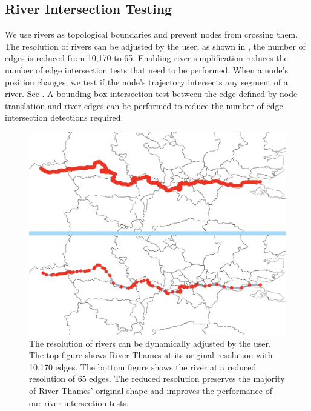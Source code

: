 
\subsection{River Intersection Testing}

We use rivers as topological boundaries and prevent nodes from crossing them. The resolution of rivers can be adjusted by the user, as shown in , the number of edges is reduced from 10,170 to 65. Enabling river simplification reduces the number of edge intersection tests that need to be performed. When a node's position changes, we test if the node's trajectory intersects any segment of a river. See . A bounding box intersection test between the edge defined by node translation and river edges can be performed to reduce the number of edge intersection detections required.


{
\begin{figure}[tb!]
    \centering
    \includegraphics[width=\columnwidth]{figure/river_resolution.png}
    \caption{The resolution of rivers can be dynamically adjusted by the user. The top figure shows River Thames at its original resolution with 10,170 edges. The bottom figure shows the river at a  reduced resolution of 65 edges. The reduced resolution preserves the majority of River Thames' original shape and improves the performance of our river intersection tests.}
    \label{fig:river resolution}
\end{figure}
}

